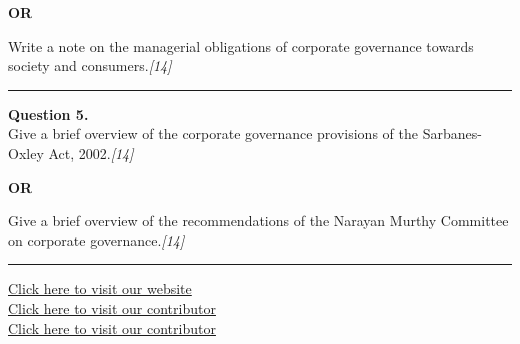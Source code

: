 \documentclass[11pt,a4paper]{article}
\newcommand{\pts}[1]{\hfill   \textit{[#1]}}
\begin{document}
\centerline{   \textbf{OR}}

Write a note on the managerial obligations of corporate governance towards society and consumers.\pts{14}

\medskip\rule{\linewidth}{0.2pt}




\noindent   \textbf{Question 5.} \\
Give a brief overview of the corporate governance provisions of the Sarbanes-Oxley Act, 2002.\pts{14}

\centerline{   \textbf{OR}}

Give a brief overview of the recommendations of the Narayan Murthy Committee on corporate governance.\pts{14}

\vfill
\rule{\linewidth}{0.4pt}

\begin{center}\small
\href{https://bhu-exam.vercel.app/}{Click here to visit our website}\\[4pt]
\href{https://me-aryan.vercel.app/}{Click here to visit our contributor}\\[4pt]
\href{https://quashan-me.vercel.app/}{Click here to visit our contributor}
\end{center}
\end{document}
